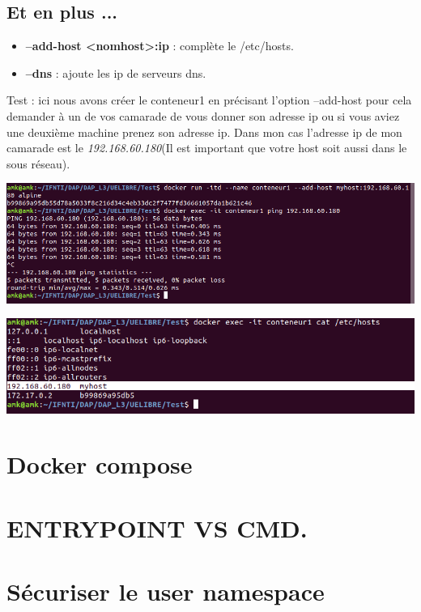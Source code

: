 \documentclass[12pt,a4paper]{article}
\begin{document}
\subsection{Et en plus ...}
\begin{itemize}
\item \textbf{--add-host <nomhost>:ip} : complète le /etc/hosts.
\item \textbf{--dns} : ajoute les ip de serveurs dns.
\end{itemize}

Test : ici nous avons créer le conteneur1 en précisant l'option --add-host pour cela 
demander à un de vos camarade de vous donner son adresse ip ou si vous aviez une deuxième
machine prenez son adresse ip. Dans mon cas l'adresse ip de mon camarade est le 
\textit{192.168.60.180}(Il est important que votre host soit aussi dans le sous réseau). 
\begin{center}
\includegraphics[scale=0.5]{img/add_host.png}
\end{center}
\begin{center}
\includegraphics[scale=0.5]{img/add_host_2.png}
\end{center}

\section{Docker compose}

\section{ENTRYPOINT VS CMD.}


\section{Sécuriser le user namespace}
\end{document}
